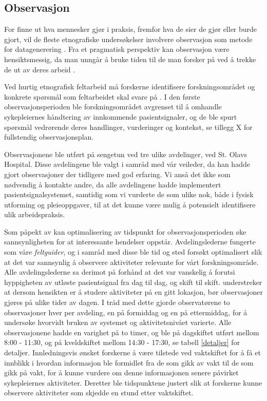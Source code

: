 \subsection{Observasjon}
\label{section:observasjon} 

For finne ut hva mennesker gjør i praksis, fremfor hva de sier de gjør eller burde gjort, vil de fleste etnografiske undersøkelser involvere observasjon som metode for datagenerering \citep{Oates, Blomberg93, Tjora}. Fra et pragmatisk perspektiv kan observasjon være hensiktsmessig, da man unngår å bruke tiden til de man forsker på ved å trekke de ut av deres arbeid \citep{Tjora}. 

\noindent
Ved hurtig etnografisk feltarbeid må forskerne identifisere forskningsområdet og konkrete spørsmål som feltarbeidet skal svare på \citep{Millen00}. I den første observasjonsperioden ble forskningsområdet avgrenset til å omhandle sykepleiernes håndtering av innkommende pasientsignaler, og de ble spurt spørsmål vedrørende deres handlinger, vurderinger og kontekst, se tillegg X for fullstendig observasjonsplan.

\noindent
Observasjonene ble utført på sengetun ved tre ulike avdelinger, ved St. Olavs Hospital. Disse avdelingene ble valgt i samråd med vår veileder, da han hadde gjort observasjoner der tidligere med god erfaring. Vi anså det ikke som nødvendig å kontakte andre, da alle avdelingene hadde implementert pasientsignalsystemet, samtidig som vi vurderte de som ulike nok, både i fysisk utforming og pleieoppgaver, til at det kunne være mulig å potensielt identifisere ulik arbeidspraksis.

\noindent
Som påpekt av \citet{Millen00} kan optimalisering av tidspunkt for observasjonsperioden øke sannsynligheten for at interessante hendelser oppstår. Avdelingslederne fungerte som våre \textit{feltguider}, og i samråd med disse ble tid og sted forsøkt optimalisert slik at det var sannsynlig å observere aktiviteter relevante for vårt forskningsområde. Alle avdelingslederne sa derimot på forhånd at det var vanskelig å forutsi hyppigheten av utløste pasientsignal fra dag til dag, og skift til skift. \citet{Blomberg93} understreker at dersom hensikten er å studere aktiviteter på en gitt lokasjon, bør observasjoner gjøres på ulike tider av dagen. I tråd med dette gjorde observatørene to observasjoner hver per avdeling, en på formiddag og en på ettermiddag, for å undersøke hvorvidt bruken av systemet og aktivitetsnivået varierte. Alle observasjonene hadde en varighet på to timer, og ble på dagskiftet utført mellom 8:00 - 11:30, og på kveldskiftet mellom 14:30 - 17:30, se tabell \ref{detaljer} for detaljer. 
Innledningsvis ønsket forskerne å være tilstede ved vaktskiftet for å få et innblikk i hvordan informasjon ble formidlet fra de som gikk av vakt til de som gikk på vakt, for å kunne vurdere om denne informasjonen senere påvirket sykepleiernes aktiviteter. Deretter ble tidspunktene justert slik at forskerne kunne observere aktiviteter som skjedde en stund etter vaktskiftet.

